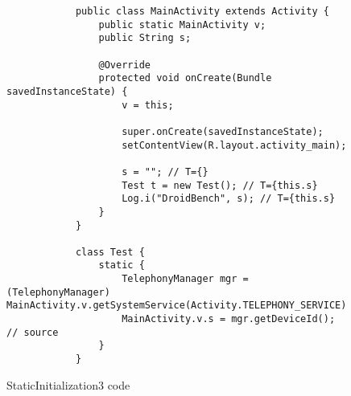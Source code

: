 \documentclass[../draft.tex]{subfiles}
\begin{document}
    \begin{figure}[ht]
        \begin{lstlisting}
            public class MainActivity extends Activity {
                public static MainActivity v;
                public String s;

                @Override
                protected void onCreate(Bundle savedInstanceState) {
                    v = this;
                
                    super.onCreate(savedInstanceState);
                    setContentView(R.layout.activity_main);
                
                    s = ""; // T={}
                    Test t = new Test(); // T={this.s}
                    Log.i("DroidBench", s); // T={this.s}
                }
            }

            class Test {
                static {
                    TelephonyManager mgr = (TelephonyManager) MainActivity.v.getSystemService(Activity.TELEPHONY_SERVICE);
                    MainActivity.v.s = mgr.getDeviceId(); // source
                }    
            }
        \end{lstlisting}
        \caption{StaticInitialization3 code}
        \label{lst:staticinit3}
    \end{figure}
\end{document}
